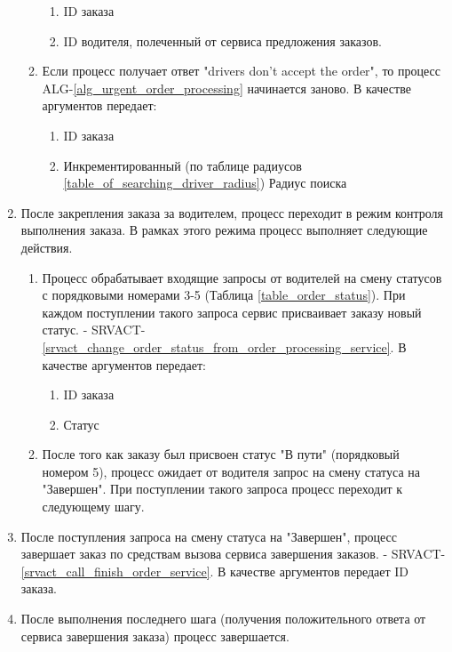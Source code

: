 \begin{alg}
\begin{enumerate}
\begin{enumerate}
           			\begin{enumerate}
             			\item ID заказа 
     					    \item ID водителя, полеченный от сервиса предложения заказов.
             		\end{enumerate}

         			\item Если процесс получает ответ "drivers don't accept the order", то процесс ALG-\ref{alg_urgent_order_processing} начинается заново. В качестве аргументов передает: 

           			\begin{enumerate}
             			\item ID заказа
             			\item Инкрементированный (по таблице радиусов \ref{table_of_searching_driver_radius}) Радиус поиска
           			\end{enumerate}
           			
         		\end{enumerate}

          \item После закрепления заказа за водителем, процесс переходит в режим контроля выполнения заказа. В рамках этого режима процесс выполняет следующие действия.

            \begin{enumerate}
              \item Процесс обрабатывает входящие запросы от водителей на смену статусов с порядковыми номерами 3-5 (Таблица \ref{table_order_status}). При каждом поступлении такого запроса сервис присваивает заказу новый статус. - SRVACT-\ref{srvact_change_order_status_from_order_processing_service}. В качестве аргументов передает: 

                \begin{enumerate}
                  \item ID заказа 
                  \item Статус
                \end{enumerate} 

              \item После того как заказу был присвоен статус "В пути" (порядковый номером 5), процесс ожидает от водителя запрос на смену статуса на "Завершен". При поступлении такого запроса процесс переходит к следующему шагу.
            \end{enumerate}

          \item После поступления запроса на смену статуса на "Завершен", процесс завершает заказ по средствам вызова сервиса завершения заказов. - SRVACT-\ref{srvact_call_finish_order_service}. В качестве аргументов передает ID заказа.

          \item После выполнения последнего шага (получения положительного ответа от сервиса завершения заказа) процесс завершается.

      	\end{enumerate}

      \end{alg}
